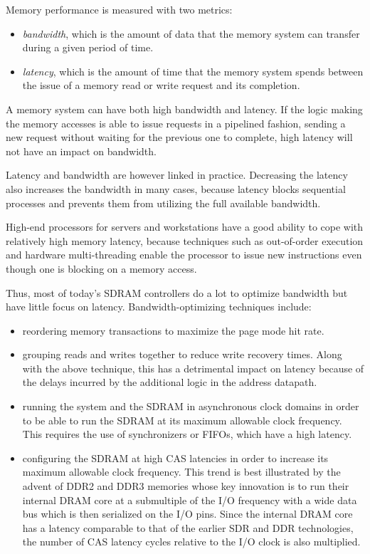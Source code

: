 \documentclass[a4paper,11pt]{kthesis}
\begin{document}
Memory performance is measured with two metrics:
\begin{itemize}
\item \textit{bandwidth}, which is the amount of data that the memory system can transfer during a given period of time.
\item \textit{latency}, which is the amount of time that the memory system spends between the issue of a memory read or write request and its completion.
\end{itemize}

A memory system can have both high bandwidth and latency. If the logic making the memory accesses is able to issue requests in a pipelined fashion, sending a new request without waiting for the previous one to complete, high latency will not have an impact on bandwidth.

Latency and bandwidth are however linked in practice. Decreasing the latency also increases the bandwidth in many cases, because latency blocks sequential processes and prevents them from utilizing the full available bandwidth.

High-end processors for servers and workstations have a good ability to cope with relatively high memory latency, because techniques such as out-of-order execution and hardware multi-threading enable the processor to issue new instructions even though one is blocking on a memory access.

Thus, most of today's SDRAM controllers do a lot to optimize bandwidth but have little focus on latency. Bandwidth-optimizing techniques include:
\begin{itemize}
\item reordering memory transactions to maximize the page mode hit rate.
\item grouping reads and writes together to reduce write recovery times. Along with the above technique, this has a detrimental impact on latency because of the delays incurred by the additional logic in the address datapath.
\item running the system and the SDRAM in asynchronous clock domains in order to be able to run the SDRAM at its maximum allowable clock frequency. This requires the use of synchronizers or FIFOs, which have a high latency.
\item configuring the SDRAM at high CAS latencies in order to increase its maximum allowable clock frequency. This trend is best illustrated by the advent of DDR2 and DDR3 memories whose key innovation is to run their internal DRAM core at a submultiple of the I/O frequency with a wide data bus which is then serialized on the I/O pins. Since the internal DRAM core has a latency comparable to that of the earlier SDR and DDR technologies, the number of CAS latency cycles relative to the I/O clock is also multiplied.
\end{itemize}
\end{document}
